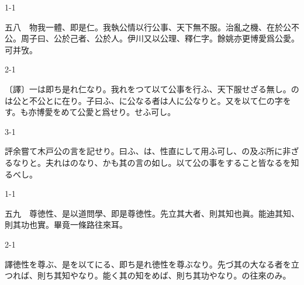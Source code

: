 \documentclass[tate,paper=b6j,jafontsize=9pt]{jlreq}
\begin{document}
\begin{azconvIndented}{1\zw}{-1\zw}

五八　物我一體、即是仁。我執公情以行公事、天下無不服。治亂之機、在於公不公。周子曰、公於己者、公於人。伊川又以公理、釋仁字。餘姚亦更博愛爲公愛。可并攷。

\end{azconvIndented}
\begin{azconvIndented}{2\zw}{-1\zw}

〔譯〕一は即ち是れ仁なり。我れをつて以て公事を行ふ、天下服せざる無し。のは公と不公とに在り。子曰ふ、に公なる者は人に公なりと。又を以て仁の字をす。も亦博愛をめて公愛と爲せり。せふ可し。

\end{azconvIndented}
\begin{azconvIndented}{3\zw}{-1\zw}

評余嘗て木戸公の言を記せり。曰ふ、は、性直にして用ふ可し、の及ぶ所に非ざるなりと。夫れはのなり、かも其の言の如し。以て公の事をすること皆なるを知るべし。

\end{azconvIndented}

\begin{azconvIndented}{1\zw}{-1\zw}

五九　尊徳性、是以道問學、即是尊徳性。先立其大者、則其知也眞。能迪其知、則其功也實。畢竟一條路往來耳。

\end{azconvIndented}
\begin{azconvIndented}{2\zw}{-1\zw}

譯徳性を尊ぶ、是を以てにる、即ち是れ徳性を尊ぶなり。先づ其の大なる者を立つれば、則ち其知やなり。能く其の知をめば、則ち其功やなり。の往來のみ。

\end{azconvIndented}
\end{document}
